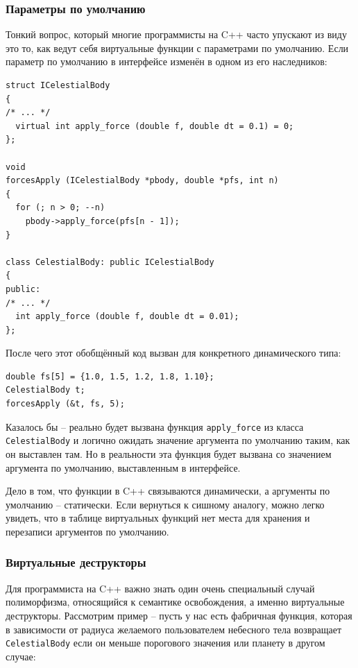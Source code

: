 \documentclass[a4paper,12pt,oneside]{article}
\begin{document}
\subsubsection{Параметры по умолчанию}\label{DefArguments}

Тонкий вопрос, который многие программисты на C++ часто упускают из виду это то, как ведут себя виртуальные функции с параметрами по умолчанию. Если параметр по умолчанию в интерфейсе изменён в одном из его наследников:

\begin{lstlisting}
struct ICelestialBody
{
/* ... */
  virtual int apply_force (double f, double dt = 0.1) = 0;
};

void 
forcesApply (ICelestialBody *pbody, double *pfs, int n)
{
  for (; n > 0; --n)
    pbody->apply_force(pfs[n - 1]);
}

class CelestialBody: public ICelestialBody
{
public:
/* ... */
  int apply_force (double f, double dt = 0.01);
};
\end{lstlisting}

После чего этот обобщённый код вызван для конкретного динамического типа:

\begin{lstlisting}
double fs[5] = {1.0, 1.5, 1.2, 1.8, 1.10};
CelestialBody t;
forcesApply (&t, fs, 5);
\end{lstlisting}

Казалось бы -- реально будет вызвана функция \lstinline!apply_force! из класса \lstinline!CelestialBody! и логично ожидать значение аргумента по умолчанию таким, как он выставлен там. Но в реальности эта функция будет вызвана со значением аргумента по умолчанию, выставленным в интерфейсе.

Дело в том, что функции в C++ связываются динамически, а аргументы по умолчанию – статически. Если вернуться к сишному аналогу, можно легко увидеть, что в таблице виртуальных функций нет места для хранения и перезаписи аргументов по умолчанию.

\subsubsection{Виртуальные деструкторы}\label{VirtDestr}

Для программиста на C++ важно знать один очень специальный случай полиморфизма, относящийся к семантике освобождения, а именно виртуальные деструкторы. Рассмотрим пример – пусть у нас есть фабричная функция, которая в зависимости от радиуса желаемого пользователем небесного тела возвращает \lstinline!CelestialBody! если он меньше порогового значения или планету в другом случае:
\end{document}

